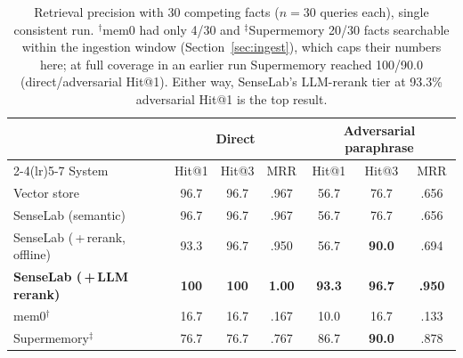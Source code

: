 \documentclass[11pt]{article}
\newcommand{\best}[1]{\textbf{#1}}
\begin{document}
\begin{table}[t]
\centering
\small
\begin{tabular}{lcccccc}
\toprule
& \multicolumn{3}{c}{Direct} & \multicolumn{3}{c}{Adversarial paraphrase} \\
\cmidrule(lr){2-4}\cmidrule(lr){5-7}
System & Hit@1 & Hit@3 & MRR & Hit@1 & Hit@3 & MRR \\
\midrule
Vector store                       & 96.7 & 96.7 & .967 & 56.7 & 76.7 & .656 \\
SenseLab (semantic)                & 96.7 & 96.7 & .967 & 56.7 & 76.7 & .656 \\
SenseLab (\,+\,rerank, offline)    & 93.3 & 96.7 & .950 & 56.7 & \best{90.0} & .694 \\
\textbf{SenseLab (\,+\,LLM rerank)}& \best{100} & \best{100} & \best{1.00} & \best{93.3} & \best{96.7} & \best{.950} \\
mem0$^\dagger$                     & 16.7 & 16.7 & .167 & 10.0 & 16.7 & .133 \\
Supermemory$^\ddagger$             & 76.7 & 76.7 & .767 & 86.7 & \best{90.0} & .878 \\
\bottomrule
\end{tabular}
\caption{Retrieval precision with 30 competing facts ($n=30$ queries each), single consistent run.
$^\dagger$mem0 had only 4/30 and $^\ddagger$Supermemory 20/30 facts searchable within the ingestion
window (Section~\ref{sec:ingest}), which caps their numbers here; at full coverage in an earlier run
Supermemory reached 100/90.0 (direct/adversarial Hit@1). Either way, SenseLab's LLM-rerank tier at
93.3\% adversarial Hit@1 is the top result.}
\label{tab:precision}
\end{table}
\end{document}

